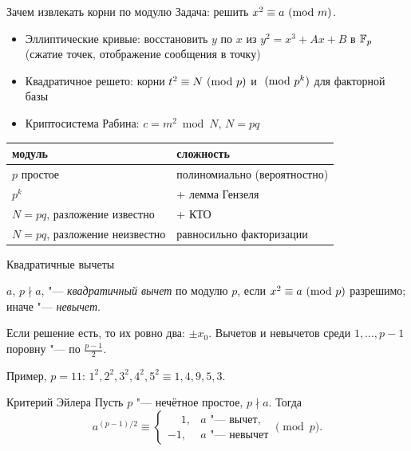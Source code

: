 \documentclass{ca-slides}
\author{}
\begin{document}
\titleframe

\begin{canvasframe}{Зачем извлекать корни по модулю}
  Задача: решить $x^2 \equiv a \ (\mathrm{mod}\ m)$.
  \begin{itemize}\small
    \item Эллиптические кривые: восстановить $y$ по $x$ из $y^2 = x^3 + Ax + B$ в $\mathbb{F}_{p}$
      (сжатие точек, отображение сообщения в точку)
    \item Квадратичное решето: корни $t^2 \equiv N \ (\mathrm{mod}\ p)$ и $\ (\mathrm{mod}\ p^k)$ для факторной базы
    \item Криптосистема Рабина: $c = m^2 \bmod N$, $N = pq$
  \end{itemize}
  \begin{center}\small
  \begin{tabular}{l|l}
    модуль & сложность \\ \hline
    $p$ простое & полиномиально (вероятностно) \\
    $p^k$ & + лемма Гензеля \\
    $N = pq$, разложение известно & + КТО \\
    $N = pq$, разложение неизвестно & \alert{равносильно факторизации}
  \end{tabular}
  \end{center}
\end{canvasframe}

\begin{canvasframe}{Квадратичные вычеты}
  \begin{definition}
    $a$, $p \nmid a$, "--- \emph{квадратичный вычет} по модулю $p$, если $x^2 \equiv a \ (\mathrm{mod}\ p)$
    разрешимо; иначе "--- \emph{невычет}.
  \end{definition}
  \begin{proposition}
    Если решение есть, то их ровно два: $\pm x_0$. Вычетов и невычетов среди
    $1, \dots, p - 1$ поровну "--- по $\frac{p-1}{2}$.
  \end{proposition}
  Пример, $p = 11$: \quad $1^2, 2^2, 3^2, 4^2, 5^2 \equiv 1, 4, 9, 5, 3$.
\end{canvasframe}

\begin{theoremframe}{Критерий Эйлера}
  Пусть $p$ "--- нечётное простое, $p \nmid a$. Тогда
  \[
    a^{(p-1)/2} \equiv \begin{cases} \phantom{-}1, & a \text{ "--- вычет},\\
      -1, & a \text{ "--- невычет} \end{cases} \pmod p.
  \]
\end{theoremframe}
\end{document}
